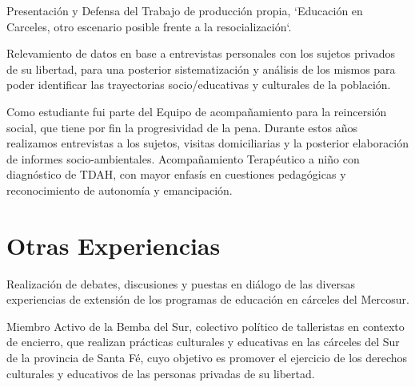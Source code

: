 \documentclass[11pt,a4paper,sans]{moderncv}        %
\begin{document}
  {
    Presentación y Defensa del Trabajo de producción propia, `Educación en Carceles, otro escenario posible frente a la resocialización`.
  }
\vspace{3mm}

  {
    Relevamiento de datos en base a entrevistas personales con los sujetos privados de su libertad, para una posterior sistematización y análisis de los mismos para poder identificar las trayectorias socio/educativas y culturales de la población.
  }
\vspace{3mm}

  {
    Como estudiante fui parte del Equipo de acompañamiento para la reincersión social, que tiene por fin la progresividad de la pena. Durante estos años realizamos entrevistas a los sujetos, visitas domiciliarias y la posterior elaboración de informes socio-ambientales.
  }
\vspace{3mm}
  {
    Acompañamiento Terap\'eutico a niño con diagnóstico de TDAH, con mayor enfasís en cuestiones pedagógicas y reconocimiento de autonomía y emancipación.
  }
\vspace{2mm}

\section{Otras Experiencias}
  {
    Realización de debates, discusiones y puestas en diálogo de las diversas experiencias de extensión de los programas de educación en cárceles del Mercosur.
  }

\vspace{2mm}

  {
    Miembro Activo de la Bemba del Sur, colectivo político de talleristas en contexto de encierro, que realizan prácticas culturales y educativas en las cárceles del Sur de la provincia de Santa Fé, cuyo objetivo es promover el ejercicio de los derechos culturales y educativos de las personas privadas de su libertad.
  }
\end{document}
